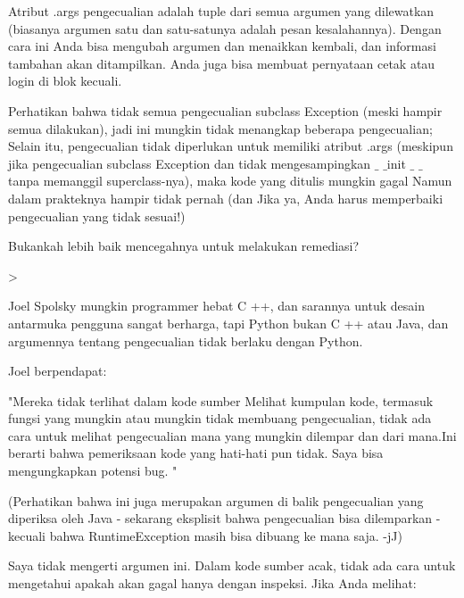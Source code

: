 Atribut .args pengecualian adalah tuple dari semua argumen yang dilewatkan (biasanya argumen satu dan satu-satunya adalah pesan kesalahannya). Dengan cara ini Anda bisa mengubah argumen dan menaikkan kembali, dan informasi tambahan akan ditampilkan. Anda juga bisa membuat pernyataan cetak atau login di blok kecuali. \par
\vspace{12pt}
Perhatikan bahwa tidak semua pengecualian subclass Exception (meski hampir semua dilakukan), jadi ini mungkin tidak menangkap beberapa pengecualian; Selain itu, pengecualian tidak diperlukan untuk memiliki atribut .args (meskipun jika pengecualian subclass Exception dan tidak mengesampingkan  $  \_  $ $  \_  $init $  \_  $ $  \_  $ tanpa memanggil superclass-nya), maka kode yang ditulis mungkin gagal Namun dalam prakteknya hampir tidak pernah (dan Jika ya, Anda harus memperbaiki pengecualian yang tidak sesuai!) \par
\vspace{12pt}
Bukankah lebih baik mencegahnya untuk melakukan remediasi? \par
\vspace{12pt}
>  \par
\vspace{12pt}
Joel Spolsky mungkin programmer hebat C ++, dan sarannya untuk desain antarmuka pengguna sangat berharga, tapi Python bukan C ++ atau Java, dan argumennya tentang pengecualian tidak berlaku dengan Python. \par
\vspace{12pt}
Joel berpendapat: \par
\vspace{12pt}
"Mereka tidak terlihat dalam kode sumber Melihat kumpulan kode, termasuk fungsi yang mungkin atau mungkin tidak membuang pengecualian, tidak ada cara untuk melihat pengecualian mana yang mungkin dilempar dan dari mana.Ini berarti bahwa pemeriksaan kode yang hati-hati pun tidak. Saya bisa mengungkapkan potensi bug. " \par
\vspace{12pt}
(Perhatikan bahwa ini juga merupakan argumen di balik pengecualian yang diperiksa oleh Java - sekarang eksplisit bahwa pengecualian bisa dilemparkan - kecuali bahwa RuntimeException masih bisa dibuang ke mana saja. -jJ) \par
\vspace{12pt}
Saya tidak mengerti argumen ini. Dalam kode sumber acak, tidak ada cara untuk mengetahui apakah akan gagal hanya dengan inspeksi. Jika Anda melihat: \par

